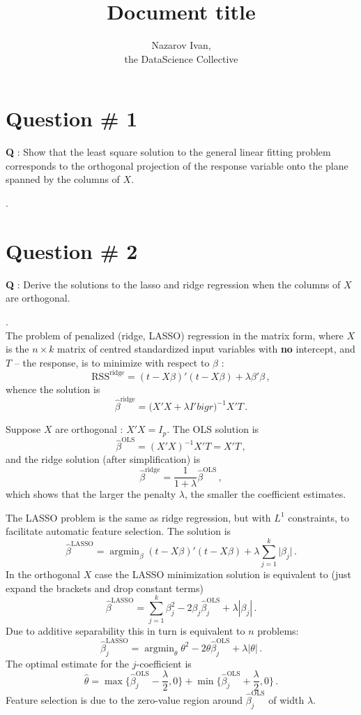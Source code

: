 \documentclass[a4paper]{article}
\title{Document title}
\author{Nazarov Ivan, \rus{101мНОД(ИССА)}\\the DataScience Collective}
\newcommand{\argmin}{\mathop{\text{argmin}}}
\newcommand{\RSS}{{\text{RSS}}}
\begin{document}
\maketitle
\tableofcontents
\clearpage

\section{Question \# 1} %
\label{sec:question_1}
\textbf{\large \textbf{Q}} : Show that the least square solution to the general
linear fitting problem corresponds to the orthogonal projection of the response
variable onto the plane spanned by the columns of $X$.

 .\hfill\\ 

\clearpage

\section{Question \# 2} %
\label{sec:question_2}
\textbf{\large \textbf{Q}} : Derive the solutions to the lasso and ridge regression
when the columns of $X$ are orthogonal.

 .\hfill\\
The problem of penalized (ridge, LASSO) regression in the matrix form, where $X$
is the $n\times k$ matrix of centred standardized input variables with \textbf{no}
intercept, and $T$ -- the response, is to minimize with respect to $\beta$ :
\[ \RSS^{\text{ridge}} = (t-X\beta)'(t-X\beta) + \lambda \beta'\beta \,, \]
whence the solution is
\[ \hat{\beta}^{\text{ridge}} = \bigl(X'X + \lambda I'bigr)^{-1} X'T \,. \]

Suppose $X$ are orthogonal : $X'X = I_p$. The OLS solution is
\[ \hat{\beta}^{\text{OLS}} = (X'X)^{-1} X'T = X'T \,, \]
and the ridge solution (after simplification) is 
\[
\hat{\beta}^{\text{ridge}} = \frac{1}{1+\lambda} \hat{\beta}^{\text{OLS}}\,,
\]
which shows that the larger the penalty $\lambda$, the smaller the coefficient estimates.

The LASSO problem is the same as ridge regression, but with $L^1$ constraints, to
facilitate automatic feature selection. The solution is
\[
\hat{\beta}^{\text{LASSO}}
= \argmin_\beta (t-X\beta)'(t-X\beta) + \lambda \sum_{j=1}^k \lvert \beta_j\rvert \,.
\]
In the orthogonal $X$ case the LASSO minimization solution is equivalent to (just
expand the brackets and drop constant terms)
\[
\hat{\beta}^{\text{LASSO}}
= \sum_{j=1}^k \beta_j^2 - 2 \beta_j \hat{\beta}^{\text{OLS}}_j + \lambda |\beta_j|\,.
\]
Due to additive separability this in turn is equivalent to $n$ problems:
\[
\hat{\beta}^{\text{LASSO}}_j
= \argmin_{\theta} \theta^2 - 2 \theta \hat{\beta}^{\text{OLS}}_j + \lambda |\theta|\,.
\]
The optimal estimate for the $j$-coefficient is
\[
\hat{\theta}
= \max\bigl\{ \hat{\beta}^{\text{OLS}}_j - \frac{\lambda}{2}, 0 \bigr\}
+ \min\bigl\{ \hat{\beta}^{\text{OLS}}_j + \frac{\lambda}{2}, 0 \bigr\}\,.
\]
Feature selection is due to the zero-value region around $\hat{\beta}^{\text{OLS}}_j$
of width $\lambda$.
\end{document}

